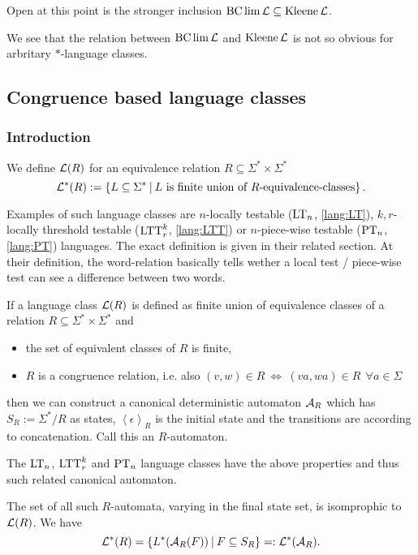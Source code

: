 Open at this point is the stronger inclusion $\operatorname{BC} \lim \mathcal{L} \subseteq \operatorname{Kleene} \mathcal{L}$.

We see that the relation between $\operatorname{BC} \lim \mathcal{L}$ and $\operatorname{Kleene} \mathcal{L}$ is not so obvious for arbritary $*$-language classes.


\subsection{Congruence based language classes}
\label{gen:R}

\subsubsection{Introduction}
\label{gen:R-automata}

\begin{mydef}
We define $\mathcal{L}(R)$ for an equivalence relation $R\subseteq\Sigma^* \times \Sigma^*$
\[ \Lang^*(R) := \Set{L \subseteq \Sigma^*}{L \text{ is finite union of $R$-equivalence-classes}} . \]
\end{mydef}

Examples of such language classes are $n$-locally testable ($\textup{\textrm{LT}}_n$, \cref{lang:LT}), $k,r$-locally threshold testable ($\textup{\textrm{LTT}}_r^k$, \cref{lang:LTT}) or $n$-piece-wise testable ($\textup{\textrm{PT}}_n$, \cref{lang:PT}) languages. The exact definition is given in their related section. At their definition, the word-relation basically tells wether a local test / piece-wise test can see a difference between two words.

If a language class $\mathcal{L}(R)$ is defined as finite union of equivalence classes of a relation $R \subseteq \Sigma^* \times \Sigma^*$ and
\begin{itemize}
\item the set of equivalent classes of $R$ is finite,
\item $R$ is a congruence relation, i.e. also $(v,w) \in R \ \Leftrightarrow \ (va,wa) \in R \ \ \forall a \in \Sigma$
\end{itemize}
then we can construct a canonical deterministic automaton $\mathcal{A}_R$ which has $S_R := \Sigma^* / R$ as states, $\left<\epsilon\right>_R$ is the initial state and the transitions are according to concatenation. Call this an $R$-automaton.

The $\textup{\textrm{LT}}_n$, $\textup{\textrm{LTT}}^k_r$ and $\textup{\textrm{PT}}_n$ language classes have the above properties and thus such related canonical automaton.

The set of all such $R$-automata, varying in the final state set, is isomprophic to $\mathcal{L}(R)$. We have
\[ \Lang^*(R) = \Set{L^*(\A_R(F))}{F \subseteq S_R} =: \Lang^*(\A_R) . \]

